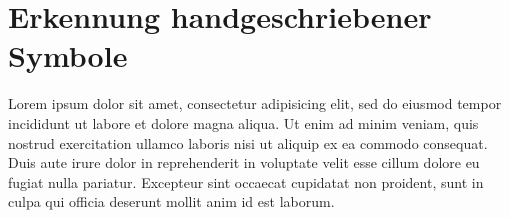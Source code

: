 \chapter{Erkennung handgeschriebener Symbole} %
\label{cha:erkennung_handgeschriebener_symbole}

Lorem ipsum dolor sit amet, consectetur adipisicing elit, sed do eiusmod tempor incididunt ut labore et dolore magna aliqua. Ut enim ad minim veniam, quis nostrud exercitation ullamco laboris nisi ut aliquip ex ea commodo consequat. Duis aute irure dolor in reprehenderit in voluptate velit esse cillum dolore eu fugiat nulla pariatur. Excepteur sint occaecat cupidatat non proident, sunt in culpa qui officia deserunt mollit anim id est laborum.

